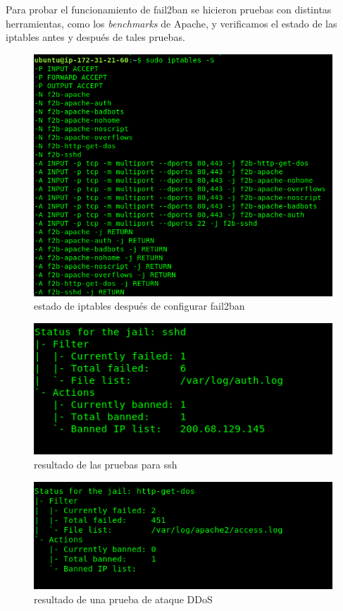 \documentclass[9pt]{article}
\begin{document}
Para probar el funcionamiento de \textsf{fail2ban} se hicieron pruebas con distintas herramientas, como los \textit{benchmarks} de Apache, y verificamos el estado de las \textsf{iptables} antes y después de tales pruebas.
\begin{figure}[H]
  \centering
  \includegraphics[scale=0.3]{fail2ban/iptables}
  \caption{estado de iptables después de configurar fail2ban}
\end{figure}
\begin{figure}[H]
  \centering
  \includegraphics[scale=0.5]{fail2ban/ssh_banned_experiment}
  \caption{resultado de las pruebas para ssh}
\end{figure}
\begin{figure}[H]
  \centering
  \includegraphics[scale=0.5]{fail2ban/fakeddos_test}
  \caption{resultado de una prueba de ataque DDoS}
\end{figure}
\end{document}
